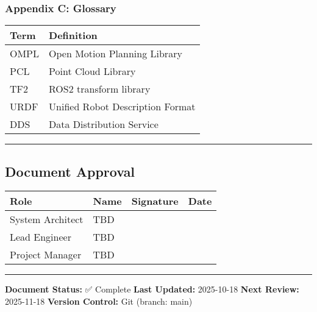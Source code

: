 \documentclass[
]{article}
\begin{document}
\hypertarget{appendix-c-glossary}{%
\subsubsection{Appendix C: Glossary}\label{appendix-c-glossary}}

\begin{longtable}[]{@{}ll@{}}
\toprule\noalign{}
Term & Definition \\
\midrule\noalign{}
\endhead
\bottomrule\noalign{}
\endlastfoot
OMPL & Open Motion Planning Library \\
PCL & Point Cloud Library \\
TF2 & ROS2 transform library \\
URDF & Unified Robot Description Format \\
DDS & Data Distribution Service \\
\end{longtable}

\begin{center}\rule{0.5\linewidth}{0.5pt}\end{center}

\hypertarget{document-approval}{%
\subsection{Document Approval}\label{document-approval}}

\begin{longtable}[]{@{}llll@{}}
\toprule\noalign{}
\textbf{Role} & \textbf{Name} & \textbf{Signature} & \textbf{Date} \\
\midrule\noalign{}
\endhead
\bottomrule\noalign{}
\endlastfoot
System Architect & TBD & & \\
Lead Engineer & TBD & & \\
Project Manager & TBD & & \\
\end{longtable}

\begin{center}\rule{0.5\linewidth}{0.5pt}\end{center}

\textbf{Document Status:} ✅ Complete \textbf{Last Updated:} 2025-10-18
\textbf{Next Review:} 2025-11-18 \textbf{Version Control:} Git (branch:
main)
\end{document}
